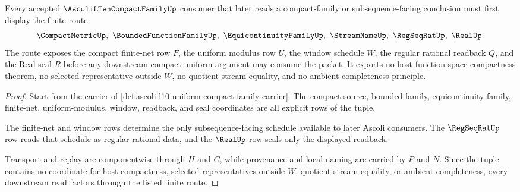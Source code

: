 \begin{theorem}\label{thm:ascoli-l10-finite-net-subsequence-obligation}
Every accepted $\AscoliLTenCompactFamilyUp$ consumer that later reads a compact-family or subsequence-facing conclusion must first display the finite route
$$
\CompactMetricUp,\ \BoundedFunctionFamilyUp,\ \EquicontinuityFamilyUp,\ \StreamNameUp,\ \RegSeqRatUp,\ \RealUp .
$$
The route exposes the compact finite-net row $F$, the uniform modulus row $U$, the window schedule $W$, the regular rational readback $Q$, and the Real seal $R$ before any downstream compact-uniform argument may consume the packet. It exports no host function-space compactness theorem, no selected representative outside $W$, no quotient stream equality, and no ambient completeness principle.
\end{theorem}
\begin{proof}
Start from the carrier of \autoref{def:ascoli-l10-uniform-compact-family-carrier}. The compact source, bounded family, equicontinuity family, finite-net, uniform-modulus, window, readback, and seal coordinates are all explicit rows of the tuple.

The finite-net and window rows determine the only subsequence-facing schedule available to later Ascoli consumers. The $\RegSeqRatUp$ row reads that schedule as regular rational data, and the $\RealUp$ row seals only the displayed readback.

Transport and replay are componentwise through $H$ and $C$, while provenance and local naming are carried by $P$ and $N$. Since the tuple contains no coordinate for host compactness, selected representatives outside $W$, quotient stream equality, or ambient completeness, every downstream read factors through the listed finite route.
\end{proof}

